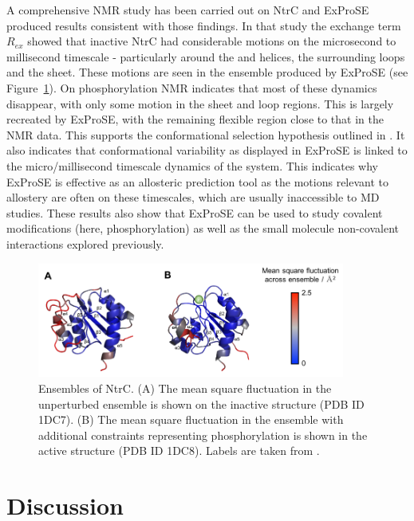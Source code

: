 A comprehensive NMR study has been carried out on NtrC \cite{Volkman2001} and ExProSE produced results consistent with those findings.
In that study the exchange term $R_{ex}$ showed that inactive NtrC had considerable motions on the microsecond to millisecond timescale - particularly around the  and  helices, the surrounding loops and the  sheet.
These motions are seen in the ensemble produced by ExProSE (see Figure~\ref{fig:ntrc}).
On phosphorylation NMR indicates that most of these dynamics disappear, with only some motion in the  sheet and loop regions.
This is largely recreated by ExProSE, with the remaining flexible region close to that in the NMR data.
This supports the conformational selection hypothesis outlined in \cite{Volkman2001}.
It also indicates that conformational variability as displayed in ExProSE is linked to the micro/millisecond timescale dynamics of the system.
This indicates why ExProSE is effective as an allosteric prediction tool as the motions relevant to allostery are often on these timescales, which are usually inaccessible to MD studies.
These results also show that ExProSE can be used to study covalent modifications (here, phosphorylation) as well as the small molecule non-covalent interactions explored previously.


\begin{figure}
\centering

\includegraphics[width=0.9\textwidth]{figures/ntrc/ntrc}

\caption[Ensembles of NtrC generated with ExProSE]
{Ensembles of NtrC.
(A) The mean square fluctuation in the unperturbed ensemble is shown on the inactive structure (PDB ID 1DC7).
(B) The mean square fluctuation in the ensemble with additional constraints representing phosphorylation is shown in the active structure (PDB ID 1DC8).
Labels are taken from \cite{Volkman2001}.}

\label{fig:ntrc}
\end{figure}


\section{Discussion}
\label{sec:exprose_discussion}

